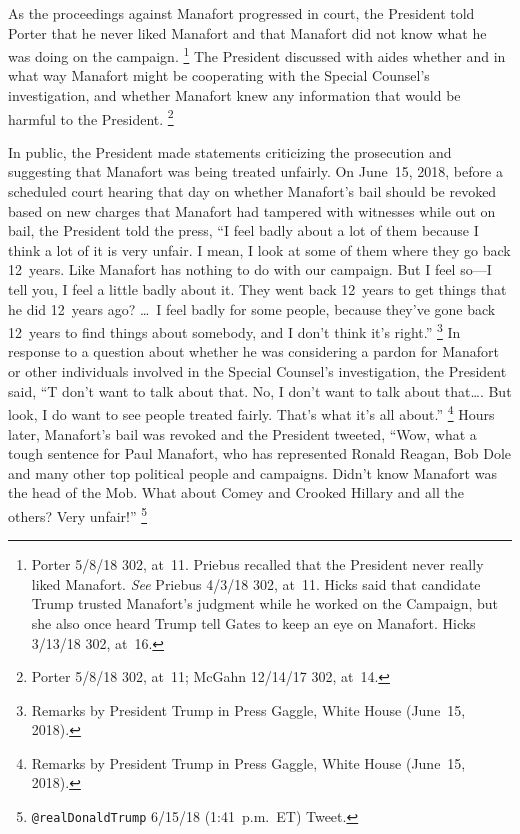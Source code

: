 As the proceedings against Manafort progressed in court, the President told Porter that he never liked Manafort and that Manafort did not know what he was doing on the campaign.%
\footnote{Porter 5/8/18 302, at~11.
Priebus recalled that the President never really liked Manafort.
\textit{See} Priebus 4/3/18 302, at~11.
Hicks said that candidate Trump trusted Manafort's judgment while he worked on the Campaign, but she also once heard Trump tell Gates to keep an eye on Manafort.
Hicks 3/13/18 302, at~16.}
The President discussed with aides whether and in what way Manafort might be cooperating with the Special Counsel's investigation, and whether Manafort knew any information that would be harmful to the President.%
\footnote{Porter 5/8/18 302, at~11;
McGahn 12/14/17 302, at~14.}

In public, the President made statements criticizing the prosecution and suggesting that Manafort was being treated unfairly.
On June~15, 2018, before a scheduled court hearing that day on whether Manafort's bail should be revoked based on new charges that Manafort had tampered with witnesses while out on bail, the President told the press, ``I feel badly about a lot of them because I think a lot of it is very unfair.
I mean, I look at some of them where they go back 12~years.
Like Manafort has nothing to do with our campaign.
But I feel so---I tell you, I feel a little badly about it.
They went back 12~years to get things that he did 12~years ago? \dots\
I feel badly for some people, because they've gone back 12~years to find things about somebody, and I don't think it's right.''%
\footnote{Remarks by President Trump in Press Gaggle, White House (June~15, 2018).}
In response to a question about whether he was considering a pardon for Manafort or other individuals involved in the Special Counsel's investigation, the President said, ``T don't want to talk about that.
No, I don't want to talk about that\dots.
But look, I do want to see people treated fairly.
That's what it's all about.''%
\footnote{Remarks by President Trump in Press Gaggle, White House (June~15, 2018).}
Hours later, Manafort's bail was revoked and the President tweeted, ``Wow, what a tough sentence for Paul Manafort, who has represented Ronald Reagan, Bob Dole and many other top political people and campaigns.
Didn't know Manafort was the head of the Mob.
What about Comey and Crooked Hillary and all the others?
Very unfair!''%
\footnote{\verb+@realDonaldTrump+ 6/15/18 (1:41~p.m.~ET) Tweet.}

